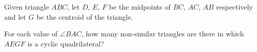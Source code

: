 Given triangle $ABC$, let $D$, $E$, $F$ be the midpoints of $BC$, $AC$, $AB$ respectively and let $G$ be the centroid of the triangle.

For each value of $\angle BAC$, how many non-similar triangles are there in which $AEGF$ is a cyclic quadrilateral?